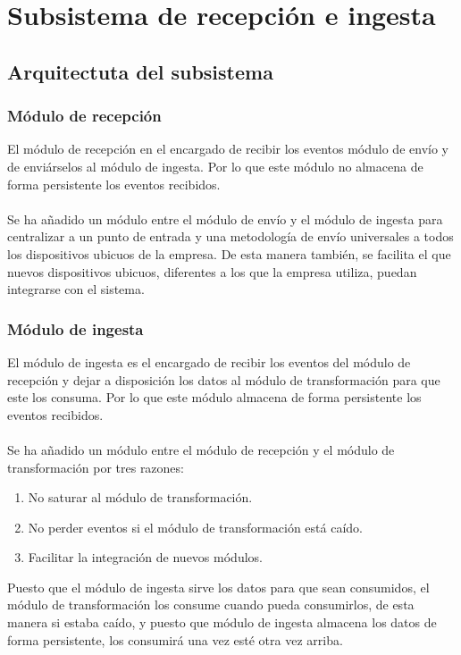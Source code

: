 \chapter{Subsistema de recepción e ingesta}

\section{Arquitectuta del subsistema}

\subsection{Módulo de recepción}

El módulo de recepción en el encargado de recibir los eventos módulo de envío y de enviárselos al módulo de ingesta. Por lo que este módulo no almacena de forma persistente los eventos recibidos.
\\\\
Se ha añadido un módulo entre el módulo de envío y el módulo de ingesta para centralizar a un punto de entrada y una metodología de envío universales a todos los dispositivos ubicuos de la empresa. De esta manera también, se facilita el que nuevos dispositivos ubicuos, diferentes a los que la empresa utiliza, puedan integrarse con el sistema.

\subsection{Módulo de ingesta}

El módulo de ingesta es el encargado de recibir los eventos del módulo de recepción y dejar a disposición los datos al módulo de transformación para que este los consuma. Por lo que este módulo almacena de forma persistente los eventos recibidos.
\\\\
Se ha añadido un módulo entre el módulo de recepción y el módulo de transformación por tres razones:

\begin{enumerate}
	\item No saturar al módulo de transformación.
	\item No perder eventos si el módulo de transformación está caído.
	\item Facilitar la integración de nuevos módulos.
\end{enumerate}

Puesto que el módulo de ingesta sirve los datos para que sean consumidos, el módulo de transformación los consume cuando pueda consumirlos, de esta manera si estaba caído, y puesto que módulo de ingesta almacena los datos de forma persistente, los consumirá una vez esté otra vez arriba.

